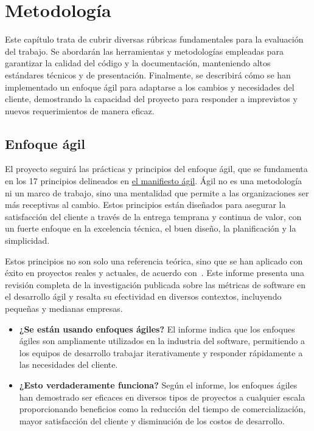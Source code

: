 \chapter{Metodología}

Este capítulo trata de cubrir diversas rúbricas fundamentales para la evaluación del trabajo. Se abordarán las herramientas y metodologías empleadas para garantizar la calidad del código y la documentación, manteniendo altos estándares técnicos y de presentación. Finalmente, se describirá cómo se han implementado un enfoque ágil para adaptarse a los cambios y necesidades del cliente, demostrando la capacidad del proyecto para responder a imprevistos y nuevos requerimientos de manera eficaz.

\section{Enfoque ágil}

El proyecto seguirá las prácticas y principios del enfoque ágil, que se fundamenta en los 17 principios delineados en \href{https://agilemanifesto.org/iso/es/manifesto.html}{el manifiesto ágil}. Ágil no es una metodología ni un marco de trabajo, sino una mentalidad que permite a las organizaciones ser más receptivas al cambio. Estos principios están diseñados para asegurar la satisfacción del cliente a través de la entrega temprana y continua de valor, con un fuerte enfoque en la excelencia técnica, el buen diseño, la planificación y la simplicidad.

Estos principios no son solo una referencia teórica, sino que se han aplicado con éxito en proyectos reales y actuales, de acuerdo con~\cite{berlas2024software}. Este informe presenta una revisión completa de la investigación publicada sobre las métricas de software en el desarrollo ágil y resalta su efectividad en diversos contextos, incluyendo pequeñas y medianas empresas.

\begin{itemize}
    \item \textbf{¿Se están usando enfoques ágiles?} El informe indica que los enfoques ágiles son ampliamente utilizados en la industria del software, permitiendo a los equipos de desarrollo trabajar iterativamente y responder rápidamente a las necesidades del cliente.
    \item \textbf{¿Esto verdaderamente funciona?} Según el informe, los enfoques ágiles han demostrado ser eficaces en diversos tipos de proyectos a cualquier escala proporcionando beneficios como la reducción del tiempo de comercialización, mayor satisfacción del cliente y disminución de los costos de desarrollo.
\end{itemize}

